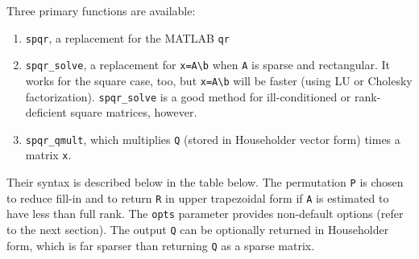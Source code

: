 \documentclass[12pt]{article}
\begin{document}
Three primary functions are available:

\begin{enumerate}

\item \verb'spqr', a replacement for the MATLAB \verb'qr'

\item \verb'spqr_solve', a replacement for \verb'x=A\b' when \verb'A' is sparse
and rectangular.  It works for the square case, too, but \verb'x=A\b' will be
faster (using LU or Cholesky factorization). \verb'spqr_solve' is a good method
for ill-conditioned or rank-deficient square matrices, however.

\item \verb'spqr_qmult', which multiplies \verb'Q' (stored in Householder
vector form) times a matrix \verb'x'.

\end{enumerate}

Their syntax is described below in the table below.
The permutation \verb'P' is chosen to reduce fill-in and to return \verb'R' in
upper trapezoidal form if \verb'A' is estimated to have less than full rank.
The \verb'opts' parameter provides non-default options (refer to the next
section).  The output \verb'Q' can be optionally returned in Householder form,
which is far sparser than returning \verb'Q' as a sparse matrix.

\vspace{0.1in}
\end{document}
